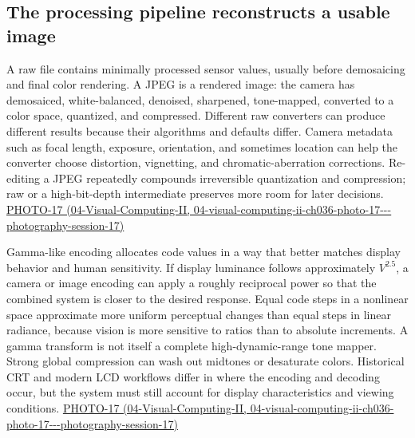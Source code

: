 \subsection{The processing pipeline reconstructs a usable image}\label{03-visual-computing-i-ch004-the-processing-pipeline-reconstructs-a-usable-image}

A raw file contains minimally processed sensor values, usually before demosaicing and final color rendering. A JPEG is a rendered image: the camera has demosaiced, white-balanced, denoised, sharpened, tone-mapped, converted to a color space, quantized, and compressed. Different raw converters can produce different results because their algorithms and defaults differ. Camera metadata such as focal length, exposure, orientation, and sometimes location can help the converter choose distortion, vignetting, and chromatic-aberration corrections. Re-editing a JPEG repeatedly compounds irreversible quantization and compression; raw or a high-bit-depth intermediate preserves more room for later decisions. \href{../04-Visual-Computing-II/main.pdf\#nameddest=04-visual-computing-ii-ch036-photo-17---photography-session-17}{PHOTO-17 (04-Visual-Computing-II, 04-visual-computing-ii-ch036-photo-17-\/-\/-photography-session-17)}

Gamma-like encoding allocates code values in a way that better matches display behavior and human sensitivity. If display luminance follows approximately \(V^{2.5}\), a camera or image encoding can apply a roughly reciprocal power so that the combined system is closer to the desired response. Equal code steps in a nonlinear space approximate more uniform perceptual changes than equal steps in linear radiance, because vision is more sensitive to ratios than to absolute increments. A gamma transform is not itself a complete high-dynamic-range tone mapper. Strong global compression can wash out midtones or desaturate colors. Historical CRT and modern LCD workflows differ in where the encoding and decoding occur, but the system must still account for display characteristics and viewing conditions. \href{../04-Visual-Computing-II/main.pdf\#nameddest=04-visual-computing-ii-ch036-photo-17---photography-session-17}{PHOTO-17 (04-Visual-Computing-II, 04-visual-computing-ii-ch036-photo-17-\/-\/-photography-session-17)}


